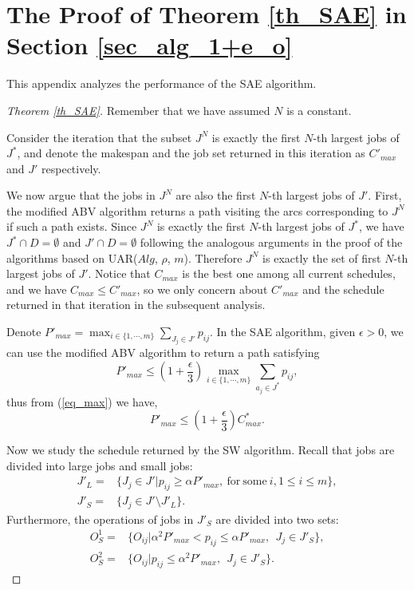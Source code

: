 \documentclass{llncs}
\newcommand{\be}{\begin{equation}}
\newcommand{\ee}{\end{equation}}
\numberwithin{subcase}{case}
\begin{document}
\section{The Proof of Theorem \ref{th_SAE} in Section \ref{sec_alg_1+e_o}}\label{app_SAE_proof}
This appendix analyzes the performance of the SAE algorithm.
\begin{proof}[Theorem \ref{th_SAE}]
Remember that we have assumed $N$ is a constant.

Consider the iteration that the subset $J^N$ is exactly the first $N$-th largest jobs of $J^*$, and denote the makespan and the job set returned in this iteration as $C'_{max}$ and $J'$ respectively.

We now argue that the jobs in $J^N$ are also the first $N$-th largest jobs of $J'$. First, the modified ABV algorithm returns a path visiting the arcs corresponding to $J^N$ if such a path exists. Since $J^N$ is exactly the first $N$-th largest jobs of $J^*$, we have $J^*\cap D = \emptyset$ and $J'\cap D = \emptyset$ following the analogous arguments in the proof of the algorithms based on UAR($Alg$, $\rho$, $m$). Therefore $J^N$ is exactly the set of first $N$-th largest jobs of $J'$. Notice that $C_{max}$ is the best one among all current schedules, and we have $C_{max}\leq C'_{max}$, so we only concern about $C'_{max}$ and the schedule returned in that iteration in the subsequent analysis.

Denote $P'_{max} = \max_{i\in \{1, \cdots, m\}}\sum_{J_j\in J'}p_{ij}$. In the SAE algorithm, given $\epsilon > 0$, we can use the modified ABV algorithm to return a path satisfying
\be
P'_{max} \leq \left(1 + \frac{\epsilon}{3}\right) \max_{i\in \{1, \cdots, m\}}\sum_{a_j\in J^*}p_{ij},
\ee
thus from (\ref{eq_max}) we have,
\be
P'_{max}\leq \left(1 + \frac{\epsilon}{3}\right)C^*_{max}. \label{eq_SAE_abv}
\ee

Now we study the schedule returned by the SW algorithm. Recall that jobs are divided into large jobs and small jobs\cite{Sevastianov1998}:
\begin{equation*}
\begin{split}
J'_L =& \{J_j\in J'| p_{ij}\geq \alpha P'_{max}, \mathrm{~for~some~}i, 1\leq i\leq m\},\\
J'_S =& \{J_j\in J'\setminus J'_L \}.
\end{split}
\end{equation*}
Furthermore, the operations of jobs in $J'_S$ are divided into two sets:
\begin{equation*}
\begin{split}
O^1_S =& \{O_{ij}| \alpha^2 P'_{max} < p_{ij} \leq \alpha P'_{max},~~J_j\in J'_S\},\\
O^2_S =& \{O_{ij}| p_{ij}\leq \alpha^2P'_{max},~~J_j\in J'_S\}.
\end{split}
\end{equation*}


\end{proof}
\end{document}
